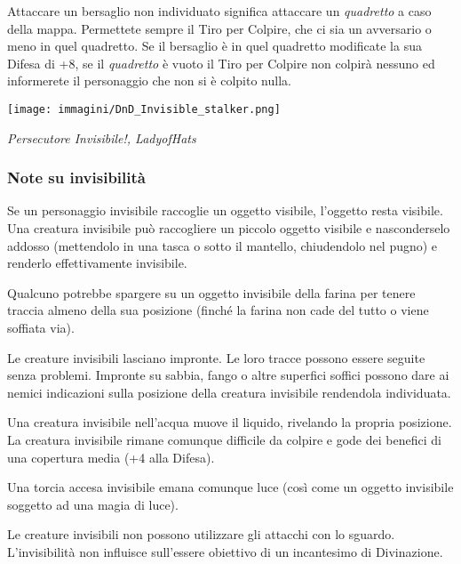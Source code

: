 \begin{multicols}{2}
Attaccare un bersaglio non individuato significa attaccare un \emph{quadretto} a caso della mappa. Permettete sempre il Tiro per Colpire, che ci sia un avversario o meno in quel quadretto. Se il bersaglio è in quel quadretto modificate la sua Difesa di +8, se il \emph{quadretto} è vuoto il Tiro per Colpire non colpirà nessuno ed informerete il personaggio che non si è colpito nulla.

\medskip
\begin{center}

	\texttt{[image: immagini/DnD\_Invisible\_stalker.png]}

	\emph{Persecutore Invisibile!, LadyofHats}

\end{center}

\medskip

%

\subsubsection{Note su invisibilità}

Se un personaggio invisibile raccoglie un oggetto visibile, l'oggetto resta visibile. Una creatura invisibile può raccogliere un piccolo oggetto visibile e nasconderselo addosso (mettendolo in una tasca o sotto il mantello, chiudendolo nel pugno) e renderlo effettivamente invisibile.

Qualcuno potrebbe spargere su un oggetto invisibile della farina per tenere traccia almeno della sua posizione (finché la farina non cade del tutto o viene soffiata via).

Le creature invisibili lasciano impronte. Le loro tracce possono essere seguite senza problemi. Impronte su sabbia, fango o altre superfici soffici possono dare ai nemici indicazioni sulla posizione della creatura invisibile rendendola individuata.

Una creatura invisibile nell'acqua muove il liquido, rivelando la propria posizione. La creatura invisibile rimane comunque difficile da colpire e gode dei benefici di una copertura media (+4 alla Difesa).

Una torcia accesa invisibile emana comunque luce (così come un oggetto invisibile soggetto ad una magia di luce).

Le creature invisibili non possono utilizzare gli attacchi con lo sguardo. L'invisibilità non influisce sull'essere obiettivo di un incantesimo di Divinazione.

\end{multicols}


%


\pagebreak

